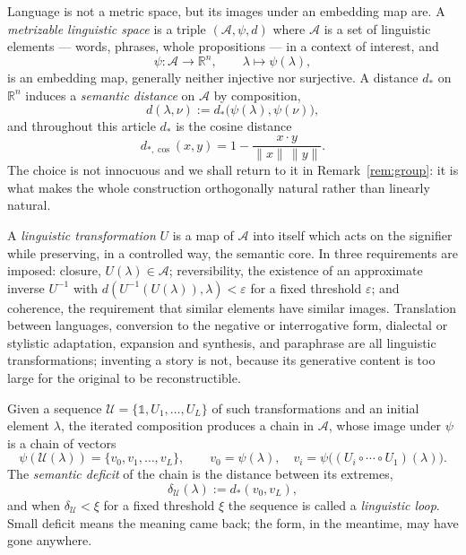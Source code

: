 \documentclass{article}
\theoremstyle{plain}
\theoremstyle{definition}
\numberwithin{equation}{section}
\newcommand{\R}{\mathbb{R}}
\newcommand{\A}{\mathscr{A}}
\newcommand{\Uc}{\mathcal{U}}
\newcommand{\eps}{\varepsilon}
\begin{document}
Language is not a metric space, but its images under an embedding map
are. A \emph{metrizable linguistic space} is a triple
$(\A,\psi,d)$ where $\A$ is a set of linguistic elements --- words,
phrases, whole propositions --- in a context of interest, and
\begin{equation}\label{eq:embed}
\psi : \A \longrightarrow \R^n , \qquad \lambda \longmapsto \psi(\lambda),
\end{equation}
is an embedding map, generally neither injective nor surjective. A
distance $d_*$ on $\R^n$ induces a \emph{semantic distance} on $\A$ by
composition,
\begin{equation}\label{eq:semdist}
d(\lambda,\nu) := d_*\bigl(\psi(\lambda),\psi(\nu)\bigr),
\end{equation}
and throughout this article $d_*$ is the cosine distance
\begin{equation}\label{eq:cosine}
d_{*,\cos}(x,y) = 1 - \frac{x\cdot y}{\|x\|\,\|y\|}.
\end{equation}
The choice is not innocuous and we shall return to it in
Remark~\ref{rem:group}: it is what makes the whole construction
orthogonally natural rather than linearly natural.

A \emph{linguistic transformation} $U$ is a map of $\A$ into itself which
acts on the signifier while preserving, in a controlled way, the
semantic core. In \cite{CM25} three requirements are imposed: closure,
$U(\lambda) \in \A$; reversibility, the existence of an approximate
inverse $U^{-1}$ with $d(U^{-1}(U(\lambda)),\lambda) < \eps$ for a fixed
threshold $\eps$; and coherence, the requirement that similar elements
have similar images. Translation between languages, conversion to the
negative or interrogative form, dialectal or stylistic adaptation,
expansion and synthesis, and paraphrase are all linguistic
transformations; inventing a story is not, because its generative
content is too large for the original to be reconstructible.

Given a sequence $\Uc = \{\mathbb{1}, U_1, \dots, U_L\}$ of such
transformations and an initial element $\lambda$, the iterated
composition produces a chain in $\A$, whose image under $\psi$ is a
chain of vectors
\begin{equation}\label{eq:chain}
\psi(\Uc(\lambda)) = \{v_0, v_1, \dots, v_L\}, \qquad
v_0 = \psi(\lambda), \quad
v_i = \psi\bigl((U_i \circ \cdots \circ U_1)(\lambda)\bigr).
\end{equation}
The \emph{semantic deficit} of the chain is the distance between its
extremes,
\begin{equation}\label{eq:deficit}
\delta_\Uc(\lambda) := d_*(v_0, v_L),
\end{equation}
and when $\delta_\Uc < \xi$ for a fixed threshold $\xi$ the sequence is
called a \emph{linguistic loop}. Small deficit means the meaning came
back; the form, in the meantime, may have gone anywhere.
\end{document}
